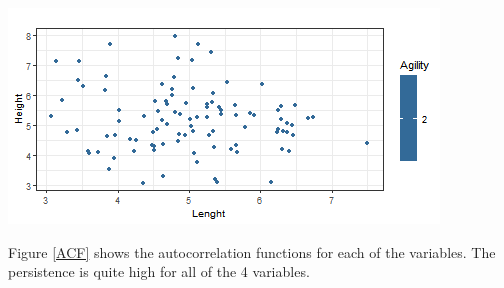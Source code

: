 \documentclass[11pt,preprint, authoryear]{elsarticle}
\let\origfigure\figure
\let\endorigfigure\endfigure
\renewenvironment{figure}[1][2] {
    \expandafter\origfigure\expandafter[H]
} {
    \endorigfigure
}
\numberwithin{equation}{section}
\numberwithin{figure}{section}
\numberwithin{table}{section}
\begin{document}
\begin{figure}[H]

{\centering \includegraphics{Thesis_files/figure-latex/Figure2-1} 

}

\caption{Caption Here \label{Figure2}}\label{fig:Figure2}
\end{figure}

Figure \ref{ACF} shows the autocorrelation functions for each of the
variables. The persistence is quite high for all of the 4 variables.
\end{document}

